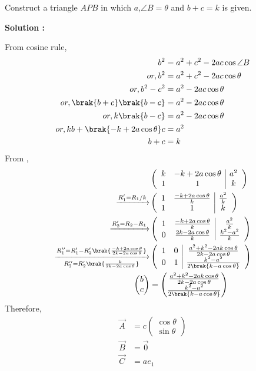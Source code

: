  Construct a triangle $APB$ in which $a$,$\angle B = \theta$ and $b+c= k$ is given.


\textbf{Solution :}

From cosine rule,
\begin{align}
  b^2&=a^2+c^2-2ac\cos{\angle B} \\
  or,b^2&=a^2+c^2-2ac\cos{\theta}\\
  or,b^2-c^2 &=a^2-2ac\cos{\theta}\\
  or,\brak{b+c}\brak{b-c}&=a^2-2ac\cos{\theta}\\
  or,k\brak{b-c}&=a^2-2ac\cos{\theta}\\
  or,kb+\brak{-k+2a\cos{\theta}}c&=a^2\\
  b+c&=k\\
\end{align}
From , \\
\begin{align}
&\begin{pmatrix}
\begin{array}{cc|c}
k&-k+2a\cos{\theta}&a^2\\
1&1&k\end{array}
\end{pmatrix}\\
\xrightarrow{R_1'=R_1/k}&\begin{pmatrix}
\begin{array}{cc|c}
1&\frac{-k+2a\cos{\theta}}{k}&\frac{a^2}{k}\\
1&1&k\end{array}
\end{pmatrix}\\
 \xrightarrow{R_2'= R_2-R_1}&\begin{pmatrix}
\begin{array}{cc|c}
1&\frac{-k+2a\cos{\theta}}{k}&\frac{a^2}{k}\\
0&\frac{2k-2a\cos{\theta}}{k}&\frac{k^2-a^2}{k}\end{array}
\end{pmatrix}\\
  \xrightarrow[R_2''=R_2'\brak{\frac{k}{2k-2a\cos{\theta}}}]{R_1''= R_1'-R_2'\brak{\frac{-k+2a\cos{\theta}}{2k-2a\cos{\theta}}}}&\begin{pmatrix}
\begin{array}{cc|c}
1&0&\frac{a^2+k^2-2ak\cos{\theta}}{2k-2a\cos{\theta}}\\
0&1&\frac{k^2-a^2}{2\brak{k-a\cos{\theta}}}\end{array}
\end{pmatrix}\\
 \begin{pmatrix}
     b\\c
 \end{pmatrix}&=\begin{pmatrix}
   \frac{a^2+k^2-2ak\cos{\theta}}{2k-2a\cos{\theta}}\\\frac{k^2-a^2}{2\brak{k-a\cos{\theta}}}
 \end{pmatrix}
\end{align}
Therefore,
\begin{align}
    \Vec{A}&=c\begin{pmatrix}
        \cos{\theta}\\\sin{\theta}
    \end{pmatrix}\\
    \Vec{B}&=\Vec{0}\\
    \Vec{C}&=ae_1
\end{align}


